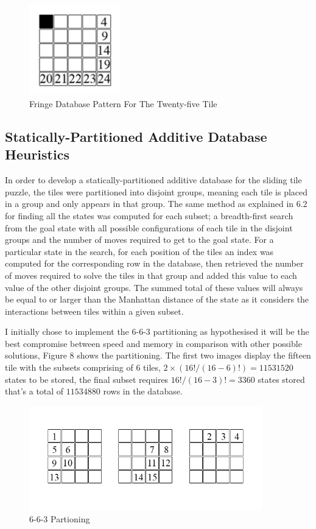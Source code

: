 \documentclass[final]{cmpreport}
\begin{document}
\begin{figure}[ht]
	\centering
	\includegraphics[width=0.35\textwidth]{fringe15}
	\captionsetup{justification=centering}
	\caption{Fringe Database Pattern For The Twenty-five Tile}
\end{figure}

\subsection{Statically-Partitioned Additive Database Heuristics}
In order to develop a statically-partitioned additive database for the sliding tile puzzle, the tiles were partitioned into disjoint groups, meaning each tile is placed in a group and only appears in that group. The same method as explained in 6.2 for finding all the states was computed for each subset; a breadth-first search from the goal state with all possible configurations of each tile in the disjoint groups and the number of moves required to get to the goal state. For a particular state in the search, for each position of the tiles an index was computed for the corresponding row in the database, then retrieved the number of moves required to solve the tiles in that group and added this value to each value of the other disjoint groups. The summed total of these values will always be equal to or larger than the Manhattan distance of the state as it considers the interactions between tiles within a given subset.	

I initially chose to implement the 6-6-3 partitioning as hypothesised it will be the best compromise between speed and memory in comparison with other possible solutions, Figure 8 shows the partitioning. The first two images display the fifteen tile with the subsets comprising of 6 tiles, $2\times(16!/(16-6)!)= 11531520$ states to be stored, the final subset requires $16!/(16-3)!=3360$ states stored that's a total of $11534880$ rows in the database. 


\begin{figure}[ht]
	\centering
	\includegraphics[width=0.9\textwidth]{15tile}
	\captionsetup{justification=centering}
	\caption{6-6-3 Partioning}
\end{figure}
\end{document}
